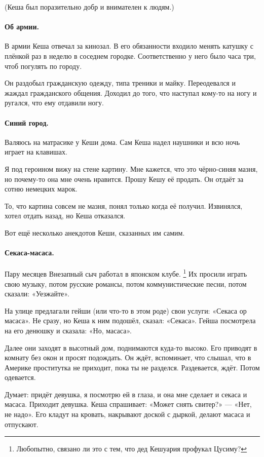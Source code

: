 \documentclass{book}
\begin{document}
(Кеша был поразительно добр и внимателен к людям.)

\paragraph{Об армии.}
В армии Кеша отвечал за кинозал. 
В его обязанности входило менять катушку с плёнкой раз в неделю в соседнем городке.
Соответственно у него было часа три, чтоб погулять по городу.

Он раздобыл гражданскую одежду, типа треники и майку.
Переодевался и жаждал гражданского общения.
Доходил до того, что наступал кому-то на ногу и ругался, что ему отдавили ногу.

\paragraph{Синий город.}
Валяюсь на матрасике у Кеши дома.
Сам Кеша надел наушники и всю ночь играет на клавишах.

Я под героином вижу на стене картину.
Мне кажется, что это чёрно-синяя мазня, но почему-то она мне очень нравится.
Прошу Кешу её продать.
Он отдаёт за сотню немецких марок.

То, что картина совсем не мазня, понял только когда её получил.
Извинялся, хотел отдать назад, но Кеша отказался.

\medskip

Вот ещё несколько анекдотов Кеши, сказанных им самим.

\paragraph{Секаса-масаса.}
Пару месяцев Внезапный сыч работал в японском клубе.%
\footnote{Любопытно, связано ли это с тем, что дед Кешуария профукал Цусиму?}
Их просили играть свою музыку, потом русские романсы, потом коммунистические песни, потом сказали: «Уезжайте».

На улице предлагали гейши (или что-то в этом роде) свои услуги: «Секаса ор масаса».
Не сразу, но Кеша к ним подошёл, сказал: «Секаса».
Гейша посмотрела на его денюшку и сказала: «Но, масаса».

Далее они заходят в высотный дом, поднимаются куда-то высоко.
Его приводят в комнату без окон и просят подождать.
Он ждёт, вспоминает, что слышал, что в Америке проститутка не приходит, пока ты не разделся.
Раздевается, ждёт.
Потом одевается.

Думает: придёт девушка, я посмотрю ей в глаза, и она мне сделает и секаса и масаса.
Приходит девушка.
Кеша спрашивает: «Может снять свитер?» --- «Нет, не надо».
Его кладут на кровать, накрывают доской с дыркой, делают масаса и отпускают.
\end{document}
